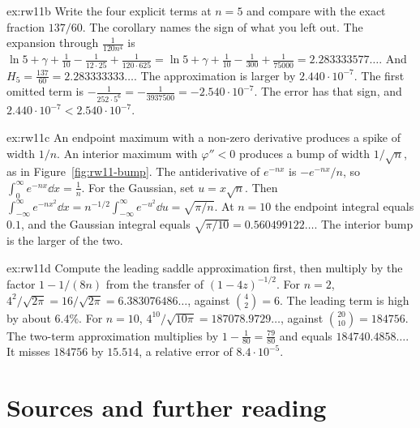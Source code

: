 \begin{solution}{ex:rw11b}
\idea Write the four explicit terms at $n=5$ and compare with the exact fraction $137/60$. The corollary names the sign of what you left out.
\writeup The expansion through $\frac1{120n^4}$ is $\ln5+\gamma+\frac1{10}-\frac1{12\cdot25}+\frac1{120\cdot625}=\ln5+\gamma+\frac1{10}-\frac1{300}+\frac1{75000}=2.283333577\ldots$. And $H_5=\frac{137}{60}=2.283333333\ldots$. The approximation is larger by $2.440\cdot10^{-7}$. The first omitted term is $-\frac1{252\cdot5^6}=-\frac1{3937500}=-2.540\cdot10^{-7}$. The error has that sign, and $2.440\cdot10^{-7}<2.540\cdot10^{-7}$.
\end{solution}

\begin{solution}{ex:rw11c}
\idea An endpoint maximum with a non-zero derivative produces a spike of width $1/n$. An interior maximum with $\varphi''<0$ produces a bump of width $1/\sqrt n$, as in Figure~\ref{fig:rw11-bump}.
\writeup The antiderivative of $e^{-nx}$ is $-e^{-nx}/n$, so $\int_0^\infty e^{-nx}\dd x=\frac1n$. For the Gaussian, set $u=x\sqrt n$. Then $\int_{-\infty}^\infty e^{-nx^2}\dd x=n^{-1/2}\int_{-\infty}^\infty e^{-u^2}\dd u=\sqrt{\pi/n}$. At $n=10$ the endpoint integral equals $0.1$, and the Gaussian integral equals $\sqrt{\pi/10}=0.560499122\ldots$. The interior bump is the larger of the two.
\end{solution}

\begin{solution}{ex:rw11d}
\idea Compute the leading saddle approximation first, then multiply by the factor $1-1/(8n)$ from the transfer of $(1-4z)^{-1/2}$.
\writeup For $n=2$, $4^2/\sqrt{2\pi}=16/\sqrt{2\pi}=6.383076486\ldots$, against $\binom42=6$. The leading term is high by about $6.4\%$. For $n=10$, $4^{10}/\sqrt{10\pi}=187078.9729\ldots$, against $\binom{20}{10}=184756$. The two-term approximation multiplies by $1-\frac1{80}=\frac{79}{80}$ and equals $184740.4858\ldots$. It misses $184756$ by $15.514$, a relative error of $8.4\cdot10^{-5}$.
\end{solution}

\section*{Sources and further reading}


